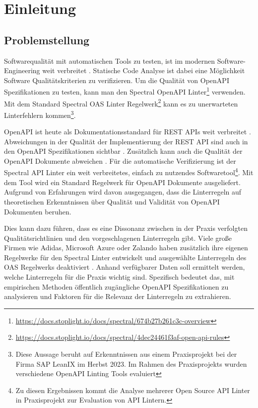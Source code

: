 \section{Einleitung} \label{sec:einleitung}
\subsection{Problemstellung} \label{sec:problemstellung}
Softwarequalität mit automatischen Tools zu testen, ist im modernen Software-Engineering weit verbreitet \parencite{tomasdottir_adoption_2018}\parencite{beller_analyzing_2016}. Statische Code Analyse ist dabei eine Möglichkeit Software Qualitätskriterien zu verifizieren. Um die Qualität von OpenAPI Spezifikationen zu testen, kann man den Spectral OpenAPI Linter\footnote{\href{https://docs.stoplight.io/docs/spectral/674b27b261c3c-overview}{https://docs.stoplight.io/docs/spectral/674b27b261c3c-overview}} \parencite{stoplight_spectral_2024-1}
verwenden. Mit dem Standard Spectral \acf{OAS} Linter Regelwerk\footnote{\href{https://docs.stoplight.io/docs/spectral/4dec24461f3af-open-api-rules}{https://docs.stoplight.io/docs/spectral/4dec24461f3af-open-api-rules}} \parencite{stoplight_spectral_2024} kann es zu unerwarteten Linterfehlern kommen\footnote{Diese Aussage beruht auf Erkenntnissen aus einem Praxisprojekt bei der Firma SAP LeanIX im Herbst 2023. Im Rahmen des Praxisprojekts wurden verschiedene OpenAPI Linting Tools evaluiert}.

OpenAPI ist heute als Dokumentationsstandard für REST APIs weit verbreitet \parencite{bogner_restruler_2024}. Abweichungen in der Qualität der Implementierung der REST API sind auch in den OpenAPI Spezifikationen sichtbar \parencite{vaziri_generating_2017}. Zusätzlich kann auch die Qualität der OpenAPI Dokumente abweichen \parencite{eriksson_using_2023}. Für die automatische Verifizierung ist der Spectral API Linter ein weit verbreitetes, einfach zu nutzendes Softwaretool\footnote{Zu diesen Ergebnissen kommt die Analyse mehrerer Open Source API Linter in Praxisprojekt zur Evaluation von API Lintern.}. Mit dem Tool wird ein Standard Regelwerk für OpenAPI Dokumente ausgeliefert. Aufgrund von Erfahrungen wird davon ausgegangen, dass die Linterregeln auf theoretischen Erkenntnissen über Qualität und Validität von OpenAPI Dokumenten beruhen.

Dies kann dazu führen, dass es eine Dissonanz zwischen in der Praxis verfolgten Qualitätsrichtlinien und den vorgeschlagenen Linterregeln gibt. Viele große Firmen wie Adidas, Microsoft Azure oder Zalando haben zusätzlich ihre eigenen Regelwerke für den Spectral Linter entwickelt und ausgewählte Linterregeln des \acs{OAS} Regelwerks deaktiviert \parencite{stoplight_spectral_2024-2}. Anhand verfügbarer Daten soll ermittelt werden, welche Linterregeln für die Praxis wichtig sind. Spezifisch bedeutet das, mit empirischen Methoden öffentlich zugängliche OpenAPI Spezifikationen zu analysieren und Faktoren für die Relevanz der Linterregeln zu extrahieren.

